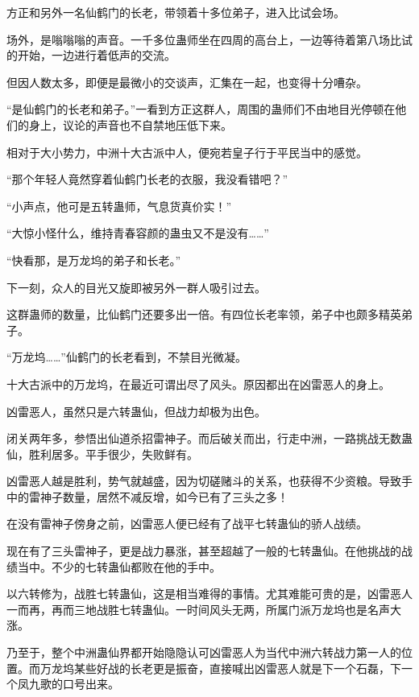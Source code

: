 
\begin{this_body}

方正和另外一名仙鹤门的长老，带领着十多位弟子，进入比试会场。

场外，是嗡嗡嗡的声音。一千多位蛊师坐在四周的高台上，一边等待着第八场比试的开始，一边进行着低声的交流。

但因人数太多，即便是最微小的交谈声，汇集在一起，也变得十分嘈杂。

“是仙鹤门的长老和弟子。”一看到方正这群人，周围的蛊师们不由地目光停顿在他们的身上，议论的声音也不自禁地压低下来。

相对于大小势力，中洲十大古派中人，便宛若皇子行于平民当中的感觉。

“那个年轻人竟然穿着仙鹤门长老的衣服，我没看错吧？”

“小声点，他可是五转蛊师，气息货真价实！”

“大惊小怪什么，维持青春容颜的蛊虫又不是没有……”

“快看那，是万龙坞的弟子和长老。”

下一刻，众人的目光又旋即被另外一群人吸引过去。

这群蛊师的数量，比仙鹤门还要多出一倍。有四位长老率领，弟子中也颇多精英弟子。

“万龙坞……”仙鹤门的长老看到，不禁目光微凝。

十大古派中的万龙坞，在最近可谓出尽了风头。原因都出在凶雷恶人的身上。

凶雷恶人，虽然只是六转蛊仙，但战力却极为出色。

闭关两年多，参悟出仙道杀招雷神子。而后破关而出，行走中洲，一路挑战无数蛊仙，胜利居多。平手很少，失败鲜有。

凶雷恶人越是胜利，势气就越盛，因为切磋赌斗的关系，也获得不少资粮。导致手中的雷神子数量，居然不减反增，如今已有了三头之多！

在没有雷神子傍身之前，凶雷恶人便已经有了战平七转蛊仙的骄人战绩。

现在有了三头雷神子，更是战力暴涨，甚至超越了一般的七转蛊仙。在他挑战的战绩当中。不少的七转蛊仙都败在他的手中。

以六转修为，战胜七转蛊仙，这是相当难得的事情。尤其难能可贵的是，凶雷恶人一而再，再而三地战胜七转蛊仙。一时间风头无两，所属门派万龙坞也是名声大涨。

乃至于，整个中洲蛊仙界都开始隐隐认可凶雷恶人为当代中洲六转战力第一人的位置。而万龙坞某些好战的长老更是振奋，直接喊出凶雷恶人就是下一个石磊，下一个凤九歌的口号出来。


\end{this_body}
